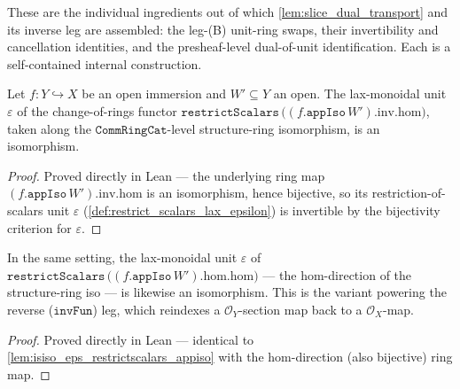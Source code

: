 These are the individual ingredients out of which \cref{lem:slice_dual_transport} and its
inverse leg are assembled: the leg-(B) unit-ring swaps, their invertibility and cancellation
identities, and the presheaf-level dual-of-unit identification. Each is a self-contained
internal construction.

\begin{lemma}
  \label{lem:isiso_eps_restrictscalars_appiso}
  Let \(f : Y \hookrightarrow X\) be an open immersion and \(W' \subseteq Y\) an open. The
  lax-monoidal unit \(\varepsilon\) of the change-of-rings functor
  \(\mathtt{restrictScalars}\,\bigl((f.\mathtt{appIso}\,W').\mathrm{inv}.\mathrm{hom}\bigr)\),
  taken along the \(\mathtt{CommRingCat}\)-level structure-ring isomorphism, is an
  isomorphism.
\end{lemma}
\begin{proof}
  \leanok
  Proved directly in Lean --- the underlying ring map
  \((f.\mathtt{appIso}\,W').\mathrm{inv}.\mathrm{hom}\) is an isomorphism, hence bijective, so
  its restriction-of-scalars unit \(\varepsilon\) (\cref{def:restrict_scalars_lax_epsilon}) is
  invertible by the bijectivity criterion for \(\varepsilon\).
\end{proof}

\begin{lemma}
  \label{lem:isiso_eps_restrictscalars_appiso_hom}
  In the same setting, the lax-monoidal unit \(\varepsilon\) of
  \(\mathtt{restrictScalars}\,\bigl((f.\mathtt{appIso}\,W').\mathrm{hom}.\mathrm{hom}\bigr)\)
  --- the \(\mathrm{hom}\)-direction of the structure-ring iso --- is likewise an
  isomorphism. This is the variant powering the reverse (\(\mathtt{invFun}\)) leg, which
  reindexes a \(\mathcal{O}_Y\)-section map back to a \(\mathcal{O}_X\)-map.
\end{lemma}
\begin{proof}
  \leanok
  Proved directly in Lean --- identical to \cref{lem:isiso_eps_restrictscalars_appiso} with
  the \(\mathrm{hom}\)-direction (also bijective) ring map.
\end{proof}

